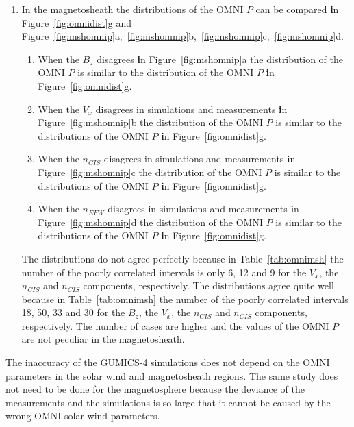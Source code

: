 \documentclass[linenumbers,draft]{agujournal}
\begin{document}
\begin{enumerate}
\item In the magnetosheath the distributions of the OMNI $P$ can be compared \textbf{i}n Figure~\ref{fig:omnidist}g and Figure~\ref{fig:mshomnip}a,~\ref{fig:mshomnip}b,~\ref{fig:mshomnip}c,~\ref{fig:mshomnip}d.
\begin{enumerate}
\item When the $B_{z}$ disagrees \textbf{i}n Figure~\ref{fig:mshomnip}a the distribution of the OMNI $P$ is similar to the distribution of the OMNI $P$ \textbf{i}n Figure~\ref{fig:omnidist}g.

\item When the $V_{x}$ disagrees in simulations and measurements \textbf{i}n Figure~\ref{fig:mshomnip}b the distribution of the OMNI $P$ is similar to the distributions of the OMNI $P$ \textbf{i}n Figure~\ref{fig:omnidist}g.

\item When the $n_{CIS}$ disagrees in simulations and measurements \textbf{i}n Figure~\ref{fig:mshomnip}c the distribution of the OMNI $P$ is similar to the distributions of the OMNI $P$ \textbf{i}n Figure~\ref{fig:omnidist}g.

\item When the $n_{EFW}$ disagrees in simulations and measurements \textbf{i}n Figure~\ref{fig:mshomnip}d the distribution of the OMNI $P$ is similar to the distributions of the OMNI $P$ \textbf{i}n Figure~\ref{fig:omnidist}g.
\end{enumerate}
The distributions do not agree perfectly because in Table~\ref{tab:omnimsh} the number of the poorly correlated intervals is only 6, 12 and 9 for the $V_{x}$, the $n_{CIS}$ and $n_{CIS}$ components, respectively. The distributions agree quite well because in Table~\ref{tab:omnimsh} the number of the poorly correlated intervals 18, 50, 33 and 30 for the $B_{z}$, the $V_{x}$, the $n_{CIS}$ and $n_{CIS}$ components, respectively. The number of cases are higher and the values of the OMNI $P$ are not peculiar in the magnetosheath.
\end{enumerate}
The inaccuracy of the GUMICS-4 simulations does not depend on the OMNI parameters in the solar wind and magnetosheath regions. The same study does not need to be done for the magnetosphere because the deviance of the measurements and the simulations is so large that it cannot be caused by the wrong OMNI solar wind parameters.

\rm %
\end{document}
